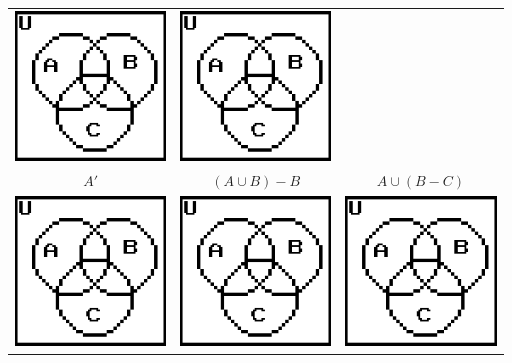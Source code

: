 \documentclass[a4paper,12pt]{book}
\newcounter{question}
\begin{document}
\begin{questionNOGRADE}{\thequestion}
\begin{center}
\begin{tabular}{c c c}
                    \includegraphics[width=4cm]{images/venndiagram.png} &
                    \includegraphics[width=4cm]{images/venndiagram.png}
                    \\
                    $A'$ &
                    $(A \cup B) - B$ &
                    $A \cup (B - C)$
                    \\
                    \includegraphics[width=4cm]{images/venndiagram.png} &
                    \includegraphics[width=4cm]{images/venndiagram.png} &
                    \includegraphics[width=4cm]{images/venndiagram.png}

\end{tabular}
\end{center}
\end{questionNOGRADE}
\end{document}
